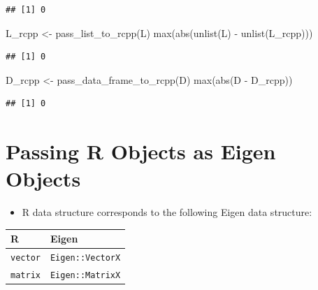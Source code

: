 \documentclass[
]{book}
\newenvironment{Shaded}{\begin{snugshade}}{\end{snugshade}}
\newcommand{\FunctionTok}[1]{\textcolor[rgb]{0.00,0.00,0.00}{#1}}
\newcommand{\NormalTok}[1]{#1}
\newcommand{\OtherTok}[1]{\textcolor[rgb]{0.56,0.35,0.01}{#1}}
\newcommand{\SpecialCharTok}[1]{\textcolor[rgb]{0.00,0.00,0.00}{#1}}
\providecommand{\tightlist}{%
  \setlength{\itemsep}{0pt}\setlength{\parskip}{0pt}}
\begin{document}
\begin{verbatim}
## [1] 0
\end{verbatim}

\begin{Shaded}
\begin{Highlighting}[]
\NormalTok{L\_rcpp }\OtherTok{\textless{}{-}} \FunctionTok{pass\_list\_to\_rcpp}\NormalTok{(L)}
\FunctionTok{max}\NormalTok{(}\FunctionTok{abs}\NormalTok{(}\FunctionTok{unlist}\NormalTok{(L) }\SpecialCharTok{{-}} \FunctionTok{unlist}\NormalTok{(L\_rcpp)))}
\end{Highlighting}
\end{Shaded}

\begin{verbatim}
## [1] 0
\end{verbatim}

\begin{Shaded}
\begin{Highlighting}[]
\NormalTok{D\_rcpp }\OtherTok{\textless{}{-}} \FunctionTok{pass\_data\_frame\_to\_rcpp}\NormalTok{(D)}
\FunctionTok{max}\NormalTok{(}\FunctionTok{abs}\NormalTok{(D }\SpecialCharTok{{-}}\NormalTok{ D\_rcpp))}
\end{Highlighting}
\end{Shaded}

\begin{verbatim}
## [1] 0
\end{verbatim}

\hypertarget{passing-r-objects-as-eigen-objects}{%
\section{Passing R Objects as Eigen Objects}\label{passing-r-objects-as-eigen-objects}}

\begin{itemize}
\tightlist
\item
  R data structure corresponds to the following Eigen data structure:
\end{itemize}

\begin{longtable}[]{@{}ll@{}}
\toprule()
R & Eigen \\
\midrule()
\endhead
\texttt{vector} & \texttt{Eigen::VectorX} \\
\texttt{matrix} & \texttt{Eigen::MatrixX} \\
\bottomrule()
\end{longtable}
\end{document}
